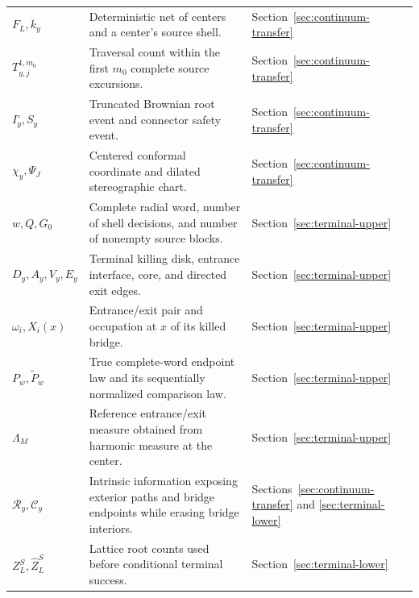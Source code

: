 \begin{longtable}{@{}p{}p{}p{}@{}}
$F_L,k_y$ & Deterministic net of centers and a center's source shell. & Section~\ref{sec:continuum-transfer} \\
$T_{y,j}^{1,m_0}$ & Traversal count within the first $m_0$ complete source excursions. & Section~\ref{sec:continuum-transfer} \\
$I_y^\circ,S_y$ & Truncated Brownian root event and connector safety event. & Section~\ref{sec:continuum-transfer} \\
$\chi_y,\Psi_J$ & Centered conformal coordinate and dilated stereographic chart. & Section~\ref{sec:continuum-transfer} \\
$w,Q,G_0$ & Complete radial word, number of shell decisions, and number of nonempty source blocks. & Section~\ref{sec:terminal-upper} \\
$D_y,A_y,V_y,E_y$ & Terminal killing disk, entrance interface, core, and directed exit edges. & Section~\ref{sec:terminal-upper} \\
$\omega_i,X_i(x)$ & Entrance/exit pair and occupation at $x$ of its killed bridge. & Section~\ref{sec:terminal-upper} \\
$P_w,\widetilde P_w$ & True complete-word endpoint law and its sequentially normalized comparison law. & Section~\ref{sec:terminal-upper} \\
$\Lambda_M$ & Reference entrance/exit measure obtained from harmonic measure at the center. & Section~\ref{sec:terminal-upper} \\
$\mathcal R_y,\mathcal C_y$ & Intrinsic information exposing exterior paths and bridge endpoints while erasing bridge interiors. & Sections~\ref{sec:continuum-transfer} and \ref{sec:terminal-lower} \\
$Z_L^S,\widehat Z_L^S$ & Lattice root counts used before conditional terminal success. & Section~\ref{sec:terminal-lower} \\
\bottomrule
\end{longtable}
\normalsize
